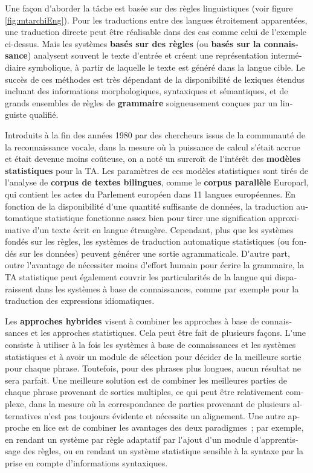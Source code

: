 \documentclass[]{../metanetpaper}
\begin{document}
\begin{french}
\begin{multicols}{2}
Une façon d{\mbox '}aborder la tâche est basée sur des règles
linguistiques (voir figure \ref{fig:mtarchiEng}). Pour les traductions entre des langues étroitement
apparentées, une traduction directe peut être réalisable dans des cas
comme celui de l{\mbox '}exemple ci-dessus. Mais les systèmes {\bf basés sur  des
règles} (ou {\bf basés sur la connaissance}) analysent souvent le texte
d{\mbox '}entrée et créent une représentation intermédiaire symbolique, à
partir de laquelle le texte est généré dans la langue cible.  Le
succès de ces méthodes est très dépendant de la disponibilité de
lexiques étendus incluant des informations morphologiques, syntaxiques
et sémantiques, et de grands ensembles de règles de {\bf grammaire}
soigneusement conçues par un linguiste qualifié.

Introduits à la fin des années 1980 par des chercheurs issus de la
communauté de la reconnaissance vocale, dans la mesure où la puissance
de calcul s{\mbox '}était accrue et était devenue moins coûteuse, on a noté un
surcroît de l{\mbox '}intérêt des {\bf modèles statistiques} pour la TA. Les
paramètres de ces modèles statistiques sont tirés de l{\mbox '}analyse de
{\bf corpus de textes bilingues}, comme le {\bf corpus parallèle} Europarl, qui
contient les actes du Parlement européen dans 11 langues
européennes. En fonction de la disponibilité d{\mbox '}une quantité suffisante
de données, la traduction automatique statistique fonctionne assez bien pour tirer une
signification approximative d{\mbox '}un texte écrit en langue
étrangère. Cependant, plus que les systèmes fondés sur les règles, les
systèmes de traduction automatique statistiques (ou fondés sur les données) peuvent
générer une sortie agrammaticale. D{\mbox '}autre part, outre l{\mbox '}avantage de
nécessiter moins d{\mbox '}effort humain pour écrire la grammaire, la TA
statistique peut également couvrir les particularités de la langue qui
disparaissent dans les systèmes à base de connaissances, comme par
exemple pour la traduction des expressions idiomatiques.

Les {\bf approches hybrides} visent à combiner les approches à base de
connaissances et les approches statistiques. Cela peut être fait de
plusieurs façons. L{\mbox '}une consiste à utiliser à la fois les
systèmes à base de connaissances et les systèmes statistiques et à
avoir un module de sélection pour décider de la meilleure sortie pour
chaque phrase. Toutefois, pour des phrases plus longues, aucun
résultat ne sera parfait. Une meilleure solution est de combiner les
meilleures parties de chaque phrase provenant de sorties multiples, ce
qui peut être relativement complexe, dans la mesure où la
correspondance de parties provenant de plusieurs alternatives n{\mbox
  '}est pas toujours évidente et nécessite un alignement. Une autre
approche en lice est de combiner les avantages des deux paradigmes~;
par exemple, en rendant un système par règle adaptatif par l{\mbox
  '}ajout d{\mbox '}un module d{\mbox '}apprentissage des règles, ou
en rendant un système statistique sensible à la syntaxe par la prise
en compte d'informations syntaxiques.


\end{multicols}
\end{french}
\end{document}
